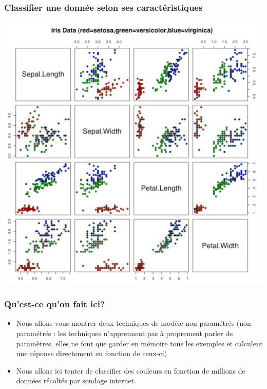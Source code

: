 \documentclass[french]{beamer}
\begin{document}
\begin{frame}[fragile]
\frametitle{Classifier une donnée selon ses
caractéristiques}

\begin{center}
\includegraphics[scale=0.32]{11.png}
\end{center}

\end{frame}



\begin{frame}
\frametitle{Qu'est-ce qu'on fait ici?}

\begin{itemize}
\item Nous allons vous montrer deux techniques de modèle non-paramétrés (non-paramétrés : les techniques n'apprennent pas à proprement parler de paramètres, elles ne font que garder en mémoire tous les exemples et calculent une réponse directement en fonction de ceux-ci)
\pause

\item Nous allons ici tenter de classifier des couleurs en fonction de millions de données récoltés par sondage internet. 
\end{itemize}

\end{frame}
\end{document}
